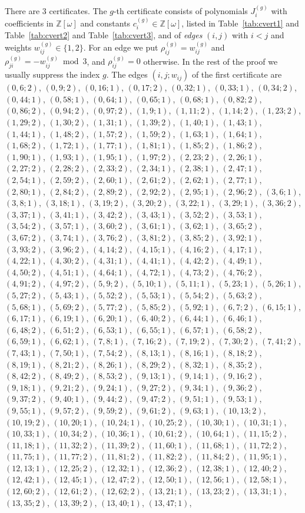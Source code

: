 \documentclass[11pt]{article}
\newcommand{\Z}{\mathbb{Z}}
\begin{document}
There are 3 certificates. The $g$-th certificate consists of polynomials $J^{(g)}_i$ with coefficients in $\Z[\omega]$ and constants $c^{(g)}_i\in\Z[\omega]$, listed in Table~\ref{tab:cvert1} and Table~\ref{tab:cvert2} and Table~\ref{tab:cvert3}, and of \emph{edges} $(i,j)$ with $i<j$ and weights $w^{(g)}_{ij}\in\{1,2\}$. For an edge we put $\rho^{(g)}_{ij}=w^{(g)}_{ij}$ and $\rho^{(g)}_{ji}=-w^{(g)}_{ij}\bmod3$, and $\rho^{(g)}_{ij}=0$ otherwise. In the rest of the proof we usually suppress the index $g$.
The edges $(i,j;w_{ij})$ of the first certificate are $(0,6;2)$, $(0,9;2)$, $(0,16;1)$, $(0,17;2)$, $(0,32;1)$, $(0,33;1)$, $(0,34;2)$, $(0,44;1)$, $(0,58;1)$, $(0,64;1)$, $(0,65;1)$, $(0,68;1)$, $(0,82;2)$, $(0,86;2)$, $(0,94;2)$, $(0,97;2)$, $(1,9;1)$, $(1,11;2)$, $(1,14;2)$, $(1,23;2)$, $(1,29;2)$, $(1,30;2)$, $(1,31;1)$, $(1,39;2)$, $(1,40;1)$, $(1,43;1)$, $(1,44;1)$, $(1,48;2)$, $(1,57;2)$, $(1,59;2)$, $(1,63;1)$, $(1,64;1)$, $(1,68;2)$, $(1,72;1)$, $(1,77;1)$, $(1,81;1)$, $(1,85;2)$, $(1,86;2)$, $(1,90;1)$, $(1,93;1)$, $(1,95;1)$, $(1,97;2)$, $(2,23;2)$, $(2,26;1)$, $(2,27;2)$, $(2,28;2)$, $(2,33;2)$, $(2,34;1)$, $(2,38;1)$, $(2,47;1)$, $(2,54;1)$, $(2,59;2)$, $(2,60;1)$, $(2,61;2)$, $(2,62;1)$, $(2,77;1)$, $(2,80;1)$, $(2,84;2)$, $(2,89;2)$, $(2,92;2)$, $(2,95;1)$, $(2,96;2)$, $(3,6;1)$, $(3,8;1)$, $(3,18;1)$, $(3,19;2)$, $(3,20;2)$, $(3,22;1)$, $(3,29;1)$, $(3,36;2)$, $(3,37;1)$, $(3,41;1)$, $(3,42;2)$, $(3,43;1)$, $(3,52;2)$, $(3,53;1)$, $(3,54;2)$, $(3,57;1)$, $(3,60;2)$, $(3,61;1)$, $(3,62;1)$, $(3,65;2)$, $(3,67;2)$, $(3,74;1)$, $(3,76;2)$, $(3,81;2)$, $(3,85;2)$, $(3,92;1)$, $(3,93;2)$, $(3,96;2)$, $(4,14;2)$, $(4,15;1)$, $(4,16;2)$, $(4,17;1)$, $(4,22;1)$, $(4,30;2)$, $(4,31;1)$, $(4,41;1)$, $(4,42;2)$, $(4,49;1)$, $(4,50;2)$, $(4,51;1)$, $(4,64;1)$, $(4,72;1)$, $(4,73;2)$, $(4,76;2)$, $(4,91;2)$, $(4,97;2)$, $(5,9;2)$, $(5,10;1)$, $(5,11;1)$, $(5,23;1)$, $(5,26;1)$, $(5,27;2)$, $(5,43;1)$, $(5,52;2)$, $(5,53;1)$, $(5,54;2)$, $(5,63;2)$, $(5,68;1)$, $(5,69;2)$, $(5,77;2)$, $(5,85;2)$, $(5,92;1)$, $(6,7;2)$, $(6,15;1)$, $(6,17;1)$, $(6,19;1)$, $(6,20;1)$, $(6,40;2)$, $(6,44;1)$, $(6,46;1)$, $(6,48;2)$, $(6,51;2)$, $(6,53;1)$, $(6,55;1)$, $(6,57;1)$, $(6,58;2)$, $(6,59;1)$, $(6,62;1)$, $(7,8;1)$, $(7,16;2)$, $(7,19;2)$, $(7,30;2)$, $(7,41;2)$, $(7,43;1)$, $(7,50;1)$, $(7,54;2)$, $(8,13;1)$, $(8,16;1)$, $(8,18;2)$, $(8,19;1)$, $(8,21;2)$, $(8,26;1)$, $(8,29;2)$, $(8,32;1)$, $(8,35;2)$, $(8,42;2)$, $(8,49;2)$, $(8,53;2)$, $(9,13;1)$, $(9,14;1)$, $(9,16;2)$, $(9,18;1)$, $(9,21;2)$, $(9,24;1)$, $(9,27;2)$, $(9,34;1)$, $(9,36;2)$, $(9,37;2)$, $(9,40;1)$, $(9,44;2)$, $(9,47;2)$, $(9,51;1)$, $(9,53;1)$, $(9,55;1)$, $(9,57;2)$, $(9,59;2)$, $(9,61;2)$, $(9,63;1)$, $(10,13;2)$, $(10,19;2)$, $(10,20;1)$, $(10,24;1)$, $(10,25;2)$, $(10,30;1)$, $(10,31;1)$, $(10,33;1)$, $(10,34;2)$, $(10,36;1)$, $(10,61;2)$, $(10,64;1)$, $(11,15;2)$, $(11,18;1)$, $(11,32;2)$, $(11,39;2)$, $(11,60;1)$, $(11,68;1)$, $(11,72;2)$, $(11,75;1)$, $(11,77;2)$, $(11,81;2)$, $(11,82;2)$, $(11,84;2)$, $(11,95;1)$, $(12,13;1)$, $(12,25;2)$, $(12,32;1)$, $(12,36;2)$, $(12,38;1)$, $(12,40;2)$, $(12,42;1)$, $(12,45;1)$, $(12,47;2)$, $(12,50;1)$, $(12,56;1)$, $(12,58;1)$, $(12,60;2)$, $(12,61;2)$, $(12,62;2)$, $(13,21;1)$, $(13,23;2)$, $(13,31;1)$, $(13,35;2)$, $(13,39;2)$, $(13,40;1)$, $(13,47;1)$, 
\end{document}
